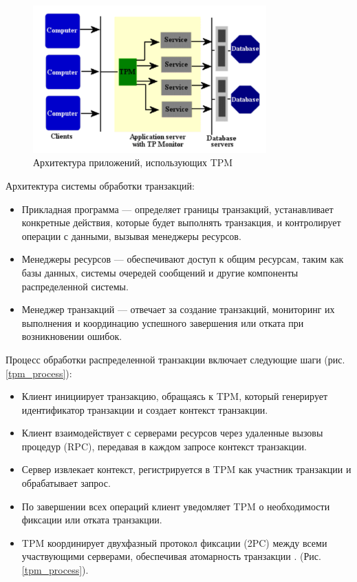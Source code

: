 \begin{figure}[h!]
    \centering
    \includegraphics[width=0.8\textwidth]{assets/distributed/TPM.png}
    \caption{Архитектура приложений, использующих TPM}
\end{figure}

Архитектура системы обработки транзакций: 

\begin{itemize} 
    \item Прикладная программа — определяет границы транзакций, устанавливает конкретные действия, которые будет выполнять транзакция, и контролирует операции с данными, вызывая менеджеры ресурсов. 
    \item Менеджеры ресурсов — обеспечивают доступ к общим ресурсам, таким как базы данных, системы очередей сообщений и другие компоненты распределенной системы. 
    \item Менеджер транзакций — отвечает за создание транзакций, мониторинг их выполнения и координацию успешного завершения или отката при возникновении ошибок. 
\end{itemize}

Процесс обработки распределенной транзакции включает следующие шаги (рис. \ref{tpm_process}):

\begin{itemize}
    \item Клиент инициирует транзакцию, обращаясь к TPM, который генерирует идентификатор транзакции и создает контекст транзакции.
    \item Клиент взаимодействует с серверами ресурсов через удаленные вызовы процедур (RPC), передавая в каждом запросе контекст транзакции.
    \item Сервер извлекает контекст, регистрируется в TPM как участник транзакции и обрабатывает запрос.
    \item По завершении всех операций клиент уведомляет TPM о необходимости фиксации или отката транзакции.
    \item TPM координирует двухфазный протокол фиксации (2PC) между всеми участвующими серверами, обеспечивая атомарность транзакции \autocite{WebServices}.
(Рис. \ref{tpm_process}). 
\end{itemize}

